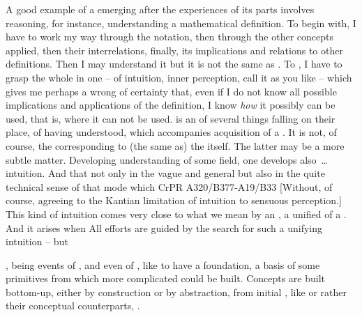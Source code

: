 A good example of a  emerging after the experiences of its parts
involves reasoning, for instance, understanding a mathematical definition.  To
begin with, I have to work my way through the notation, then through the other
concepts applied, then their interrelations, finally, its implications and
relations to other definitions.  Then I may understand it but it is not the same
as .  To , I have to grasp the whole in one 
-- of intuition, inner perception, call it as you like -- which gives me perhaps
a wrong  of certainty that, even if I do not know all possible
implications and applications of the definition, I know {\em how} it possibly
can be used, that is, where it can not be used.   is an
 of several things falling on their place, of having understood,
which accompanies acquisition of a . It is not, of course, the
 corresponding to (the same  as) the 
itself. The latter may be a more subtle matter. Developing understanding of some
field, one develops also~\ldots intuition. And that not only in the vague and
general but also in the quite technical sense of that mode which \citet{relates
  immediately to the object, and is single. [...]  In whatsoever mode, or by
  whatsoever means, our knowledge may relate to objects, it is at least quite
  clear that the only manner in which it immediately relates to them is by means
  of an intuition.}{CrPR}{ A320/B377-A19/B33 [Without,
  of course, agreeing to the Kantian limitation of intuition to sensuous
  perception.]} This kind of intuition comes very close to what we mean by an
, a unified  of a . And it arises when
  All  efforts are
guided by the search for such a unifying intuition -- but 




\pa
{}, being events of , and even 
of , like to have a  
foundation, a basis of some primitives from which more 
complicated  could be built. 
Concepts are built bottom-up, either by construction or by abstraction, from
initial , like  or rather their conceptual
counterparts, .

